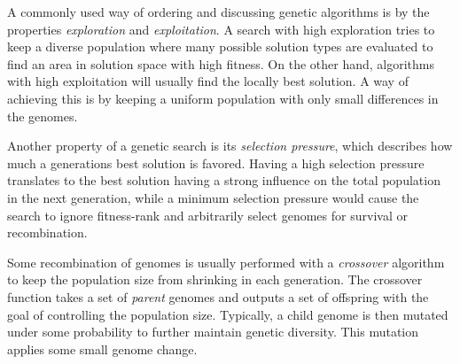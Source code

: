 A commonly used way of ordering and discussing genetic algorithms is by the properties \textit{exploration} and \textit{exploitation}. A search with high exploration tries to keep a diverse population where many possible solution types are evaluated to find an area in solution space with high fitness. On the other hand, algorithms with high exploitation will usually find the locally best solution. A way of achieving this is by keeping a uniform population with only small differences in the genomes.

Another property of a genetic search is its \textit{selection pressure}, which describes how much a generations best solution is favored. Having a high selection pressure translates to the best solution having a strong influence on the total population in the next generation, while a minimum selection pressure would cause the search to ignore fitness-rank and arbitrarily select genomes for survival or recombination.

Some recombination of genomes is usually performed with a \textit{crossover} algorithm to keep the population size from shrinking in each generation.  The crossover function takes a set of \textit{parent} genomes and outputs a set of offspring with the goal of controlling the population size.  Typically, a child genome is then mutated under some probability to further maintain genetic diversity. This mutation applies some small genome change.


